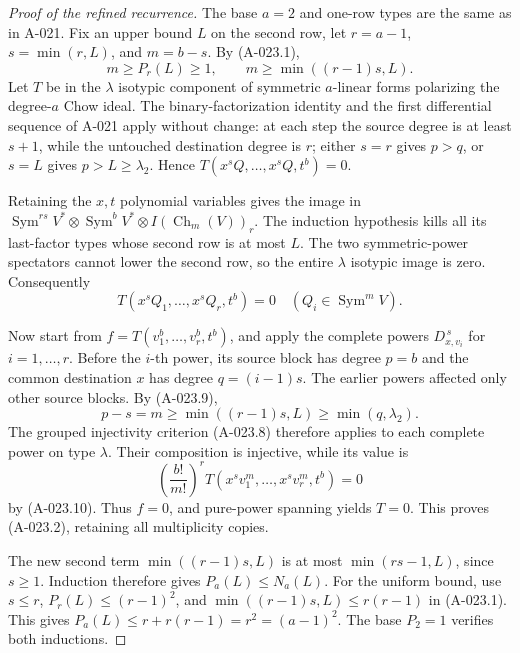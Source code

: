 \begin{proof}[Proof of the refined recurrence]
The base $a=2$ and one-row types are the same as in A-021.
Fix an upper bound $L$ on the second row, let $r=a-1$,
$s=\min(r,L)$, and $m=b-s$. By (A-023.1),
\[
                m\geq P_r(L)\geq1,
                \qquad m\geq\min((r-1)s,L).            \tag{A-023.9}
\]
Let $T$ be in the $\lambda$ isotypic component of symmetric
$a$-linear forms polarizing the degree-$a$ Chow ideal.
The binary-factorization identity and the first differential
sequence of A-021 apply without change: at each step the
source degree is at least $s+1$, while the untouched
destination degree is $r$; either $s=r$ gives $p>q$, or
$s=L$ gives $p>L\geq\lambda_2$. Hence
$T(x^sQ,\ldots,x^sQ,t^b)=0$.

Retaining the $x,t$ polynomial variables gives the image in
$\operatorname{Sym}^{rs}V^*\otimes\operatorname{Sym}^bV^*
\otimes I(\operatorname{Ch}_m(V))_r$.
The induction hypothesis kills all its last-factor types
whose second row is at most $L$. The two symmetric-power
spectators cannot lower the second row, so the entire
$\lambda$ isotypic image is zero. Consequently
\[
 T(x^sQ_1,\ldots,x^sQ_r,t^b)=0
                   \quad(Q_i\in\operatorname{Sym}^mV). \tag{A-023.10}
\]

Now start from $f=T(v_1^b,\ldots,v_r^b,t^b)$, and apply
the complete powers $D_{x,v_i}^{\,s}$ for $i=1,\ldots,r$.
Before the $i$-th power, its source block has degree $p=b$
and the common destination $x$ has degree $q=(i-1)s$.
The earlier powers affected only other source blocks.
By (A-023.9),
\[
 p-s=m\geq\min((r-1)s,L)\geq\min(q,\lambda_2).
\]
The grouped injectivity criterion (A-023.8) therefore applies
to each complete power on type $\lambda$. Their composition
is injective, while its value is
\[
 \left(\frac{b!}{m!}\right)^r
                   T(x^sv_1^m,\ldots,x^sv_r^m,t^b)=0
\]
by (A-023.10). Thus $f=0$, and pure-power spanning yields
$T=0$. This proves (A-023.2), retaining all multiplicity copies.

The new second term $\min((r-1)s,L)$ is at most
$\min(rs-1,L)$, since $s\geq1$. Induction therefore
gives $P_a(L)\leq N_a(L)$. For the uniform bound, use
$s\leq r$, $P_r(L)\leq(r-1)^2$, and
$\min((r-1)s,L)\leq r(r-1)$ in (A-023.1). This gives
$P_a(L)\leq r+r(r-1)=r^2=(a-1)^2$.
The base $P_2=1$ verifies both inductions.
\end{proof}

